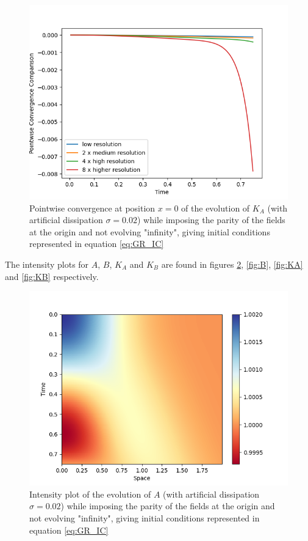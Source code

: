 \begin{figure}[t!]
    \centering
    \includegraphics[width=\columnwidth]{Images/KA-point.png}
    \caption{Pointwise convergence at position $x = 0$ of the evolution of $K_A$ (with artificial dissipation $\sigma = 0.02$) while imposing the parity of the fields at the origin and not evolving "infinity", giving initial conditions represented in equation \eqref{eq:GR_IC}}
    \label{fig:point_KA}
\end{figure}

The intensity plots for $A$, $B$, $K_A$ and $K_B$ are found in figures \ref{fig:A}, \ref{fig:B}, \ref{fig:KA} and \ref{fig:KB} respectively.

\begin{figure}[t!]
    \centering
    \includegraphics[width=\columnwidth]{Images/adm_evolution-2nd_order-A.png}
    \caption{Intensity plot of the evolution of $A$ (with artificial dissipation $\sigma = 0.02$) while imposing the parity of the fields at the origin and not evolving "infinity", giving initial conditions represented in equation \eqref{eq:GR_IC}}
    \label{fig:A}
\end{figure}


